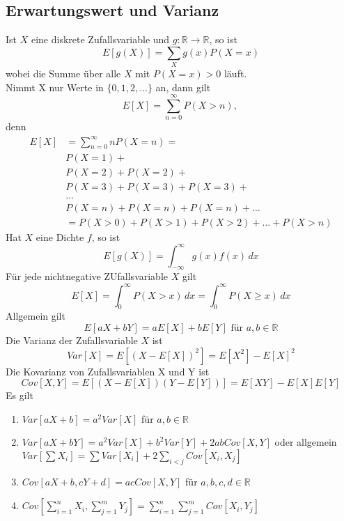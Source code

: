 \documentclass[a4paper,12pt]{article}
\begin{document}
\subsection{Erwartungswert und Varianz}
Ist $X$ eine diskrete Zufallsvariable und $g: \mathbb{R} \to \mathbb{R}$, so ist
$$
	E[g(X)] = \sum_{X} g(x)P(X=x)
$$
wobei die Summe über alle $X$ mit $P(X=x) > 0$ läuft.\\
Nimmt X nur Werte in $\{ 0, 1, 2, ...    \}$ an, dann gilt
$$
	E[X] = \sum_{n=0}^{\infty}P(X>n) \text{, }
$$
denn
\begin{align*}
	E[X] & = \sum_{n=0}^{\infty} n P(X=n) =              \\
	     & P(X=1) +                                      \\
	     & P(X=2) + P(X=2) +                             \\
	     & P(X=3) + P(X=3) + P(X=3) +                    \\
	     & \dots                                         \\
	     & P(X=n) + P(X=n) + P(X=n) + \dots              \\
	     & = P(X>0) + P(X > 1) + P(X>2) + \dots + P(X>n)
\end{align*}
Hat $X$ eine Dichte $f$, so ist
$$
	E[g(X)] = \int_{-\infty}^{\infty}g(x)f(x) \,dx
$$
Für jede nichtnegative ZUfallsvariable $X$ gilt
$$
	E[X] = \int_{0}^{\infty}P(X>x) \, dx = \int_{0}^{\infty}P( X\geq x) \, dx
$$
Allgemein gilt
$$
	E[aX + bY] = aE[X] + bE[Y] \text{ für } a,b \in \mathbb{R}
$$
Die Varianz der Zufallsvariable $X$ ist
$$
	Var[X] = E \left[ (X- E[X])^2     \right] = E\left[ X^2 \right] - E[X]^2
$$
Die Kovarianz von Zufallsvariablen X und Y ist
$$
	Cov[X,Y] = E \left[ (X-E[X])(Y-E[Y])    \right] = E[XY] - E[X]E[Y]
$$
Es gilt
\begin{enumerate}
	\item $Var[aX + b] = a^2Var[X]$ für $a,b \in \mathbb{R}$
	\item $Var[aX + bY] = a^2Var[X] + b^2Var[Y] + 2abCov[X,Y]     $ oder allgemein $Var \left[ \sum X_i \right] = \sum Var[X_i] + 2 \sum_{i<j}Cov[X_i,X_j]$
	\item $Cov[aX + b, cY + d] = acCov[X,Y]$ für $a,b,c,d \in \mathbb{R}$
	\item $Cov \left[\sum_{i=1}^{n}X_i, \sum_{j=1}^{m}Y_j      \right] = \sum_{i=1}^{n}\sum_{j=1}^{m}Cov[X_i,Y_j]$
\end{enumerate}
\end{document}
